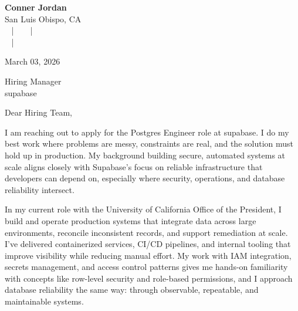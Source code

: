 \documentclass[letterpaper,11pt]{article}
\newcommand{\companyname}{supabase}
\begin{document}
\begin{center}
  {\Huge \textbf{Conner Jordan}}\\[4pt]
  {\Large San Luis Obispo, CA}\\[4pt]
  \href{tel:+18059759793}{
    } ~ | ~
  \href{mailto:connercharlesjordan@gmail.com}{
    } ~ | ~
   \\
  \href{https://www.linkedin.com/in/conner-jordan-4b268514a/}{
    } ~ | ~
  \href{https://github.com/cjordan223}{
    }
\end{center}

\vspace{16pt}

\begin{flushright}
March 03, 2026
\end{flushright}

Hiring Manager\\
\companyname

\vspace{26pt}

\noindent
Dear Hiring Team,

\vspace{16pt}

I am reaching out to apply for the Postgres Engineer role at \companyname. I do my best work where problems are messy, constraints are real, and the solution must hold up in production. My background building secure, automated systems at scale aligns closely with Supabase’s focus on reliable infrastructure that developers can depend on, especially where security, operations, and database reliability intersect.

\vspace{16pt}

In my current role with the University of California Office of the President, I build and operate production systems that integrate data across large environments, reconcile inconsistent records, and support remediation at scale. I’ve delivered containerized services, CI/CD pipelines, and internal tooling that improve visibility while reducing manual effort. My work with IAM integration, secrets management, and access control patterns gives me hands-on familiarity with concepts like row-level security and role-based permissions, and I approach database reliability the same way: through observable, repeatable, and maintainable systems.
\end{document}
